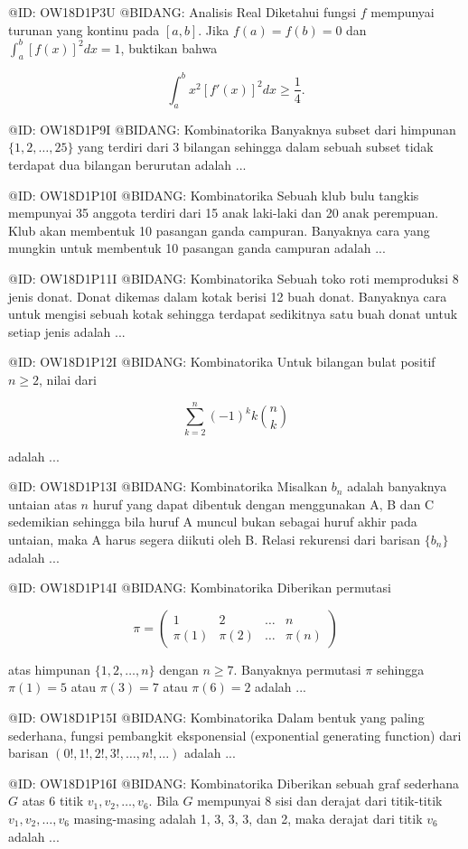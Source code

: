 @ID: OW18D1P3U
@BIDANG: Analisis Real
Diketahui fungsi $f$ mempunyai turunan yang kontinu pada $[a, b]$. Jika $f(a) = f(b) = 0$ dan $\int_a^b [f(x)]^2 dx = 1$, buktikan bahwa

$$
\int_a^b x^2[f'(x)]^2 dx \ge \frac{1}{4}.
$$

@ID: OW18D1P9I
@BIDANG: Kombinatorika
Banyaknya subset dari himpunan $\{1, 2, \dots, 25\}$ yang terdiri dari 3 bilangan sehingga dalam sebuah subset tidak terdapat dua bilangan berurutan adalah ...

@ID: OW18D1P10I
@BIDANG: Kombinatorika
Sebuah klub bulu tangkis mempunyai 35 anggota terdiri dari 15 anak laki-laki dan 20 anak perempuan. Klub akan membentuk 10 pasangan ganda campuran. Banyaknya cara yang mungkin untuk membentuk 10 pasangan ganda campuran adalah ...

@ID: OW18D1P11I
@BIDANG: Kombinatorika
Sebuah toko roti memproduksi 8 jenis donat. Donat dikemas dalam kotak berisi 12 buah donat. Banyaknya cara untuk mengisi sebuah kotak sehingga terdapat sedikitnya satu buah donat untuk setiap jenis adalah ...

@ID: OW18D1P12I
@BIDANG: Kombinatorika
Untuk bilangan bulat positif $n \ge 2$, nilai dari 

$$
\sum_{k=2}^n (-1)^k k \binom{n}{k}
$$

adalah ...

@ID: OW18D1P13I
@BIDANG: Kombinatorika
Misalkan $b_n$ adalah banyaknya untaian atas $n$ huruf yang dapat dibentuk dengan menggunakan A, B dan C sedemikian sehingga bila huruf A muncul bukan sebagai huruf akhir pada untaian, maka A harus segera diikuti oleh B. Relasi rekurensi dari barisan $\{b_n\}$ adalah ...

@ID: OW18D1P14I
@BIDANG: Kombinatorika
Diberikan permutasi 

$$
\pi = \begin{pmatrix} 1 & 2 & \dots & n \\ \pi(1) & \pi(2) & \dots & \pi(n) \end{pmatrix}
$$

atas himpunan $\{1, 2, \dots, n\}$ dengan $n \ge 7$. Banyaknya permutasi $\pi$ sehingga $\pi(1) = 5$ atau $\pi(3) = 7$ atau $\pi(6) = 2$ adalah ...

@ID: OW18D1P15I
@BIDANG: Kombinatorika
Dalam bentuk yang paling sederhana, fungsi pembangkit eksponensial (exponential generating function) dari barisan $(0!, 1!, 2!, 3!, \dots, n!, \dots)$ adalah ...

@ID: OW18D1P16I
@BIDANG: Kombinatorika
Diberikan sebuah graf sederhana $G$ atas 6 titik $v_1, v_2, \dots, v_6$. Bila $G$ mempunyai 8 sisi dan derajat dari titik-titik $v_1, v_2, \dots, v_6$ masing-masing adalah 1, 3, 3, 3, dan 2, maka derajat dari titik $v_6$ adalah ...

